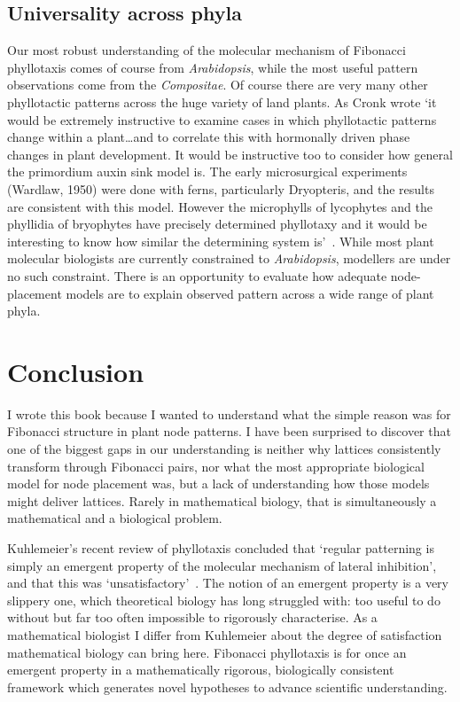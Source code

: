 \subsection{Universality across phyla}
Our most robust understanding of the molecular mechanism of Fibonacci phyllotaxis comes of course from \textit{Arabidopsis}, while the most useful pattern observations come from the \textit{Compositae}. Of course there are very many other phyllotactic patterns across the huge variety of land plants. As Cronk wrote `it would be extremely instructive to examine cases in which phyllotactic patterns change within a plant\ldots and to correlate this with hormonally driven phase changes in plant development. It would be instructive too to consider how general the primordium auxin sink model is. The early microsurgical experiments (Wardlaw, 1950) were done with ferns, particularly Dryopteris, and the results are consistent with this model. However the microphylls of lycophytes and the phyllidia of bryophytes have precisely determined phyllotaxy and it would be interesting to know how similar the determining system is'~\autocite[p120]{cronkMolecularOrganographyPlants2009}. 
While most plant molecular biologists are currently constrained to \textit{Arabidopsis}, modellers are under no such constraint.
There is an opportunity to evaluate how adequate node-placement models are to explain observed pattern  across a wide range of plant phyla.

\section{Conclusion}
I wrote this book because I wanted to understand what the simple reason was for Fibonacci structure in plant node patterns. I have been surprised to discover that one of the biggest gaps in our understanding is neither why lattices consistently transform through Fibonacci pairs, nor what the most appropriate biological model for node placement was, but a lack of understanding how those models might deliver lattices. Rarely in mathematical biology, that is simultaneously a mathematical and a biological problem. 

Kuhlemeier's recent review of phyllotaxis concluded  that `regular patterning is simply an emergent property of the molecular mechanism of lateral inhibition', and that this was  `unsatisfactory'~\autocite{kuhlemeierPhyllotaxis2017}. 
The notion of an emergent property is a very slippery one, which theoretical biology has long struggled with: too useful to do without but far too often impossible to rigorously characterise. As a mathematical biologist I differ from Kuhlemeier about the degree of satisfaction mathematical biology can bring here. Fibonacci phyllotaxis is for once an emergent property in a mathematically rigorous, biologically consistent framework which generates novel hypotheses to advance scientific understanding. 


